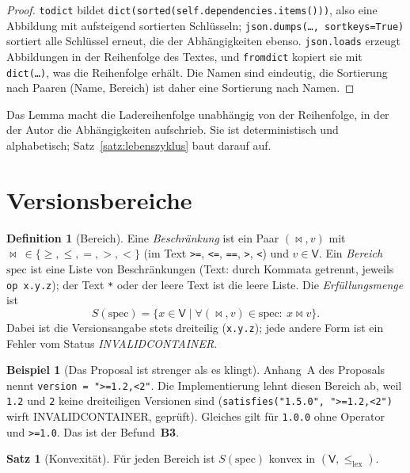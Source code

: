 \documentclass[a4paper,12pt,twoside]{report}
\DeclareRobustCommand{\_}{\ifmmode\mbox{\textunderscore}\else\textunderscore\allowbreak{}\fi}
\theoremstyle{definition}
\newtheorem{definition}{Definition}[chapter]
\newtheorem{beispiel}{Beispiel}[chapter]
\newtheorem{satz}{Satz}[chapter]
\newcommand{\Bf}[1]{\textbf{B#1}}
\begin{document}
\begin{proof}
	\texttt{to\_dict} bildet \texttt{dict(sorted(self.dependencies.items()))}, also eine Abbildung mit aufsteigend sortierten Schlüsseln; \texttt{json.dumps(\ldots, sort\_keys=True)} sortiert alle Schlüssel erneut, die der Abhängigkeiten ebenso. \texttt{json.loads} erzeugt Abbildungen in der Reihenfolge des Textes, und \texttt{from\_dict} kopiert sie mit \texttt{dict(\ldots)}, was die Reihenfolge erhält. Die Namen sind eindeutig, die Sortierung nach Paaren (Name, Bereich) ist daher eine Sortierung nach Namen.
\end{proof}

Das Lemma macht die Ladereihenfolge unabhängig von der Reihenfolge, in der der Autor die Abhängigkeiten aufschrieb. Sie ist deterministisch und alphabetisch; Satz~\ref{satz:lebenszyklus} baut darauf auf.

\section{Versionsbereiche}
\label{sec:versionen}

\begin{definition}[Bereich]
	\label{def:range}
	Eine \emph{Beschränkung} ist ein Paar $(\bowtie,v)$ mit $\bowtie\ \in\{\ge,\le,=,>,<\}$ (im Text \texttt{>=}, \texttt{<=}, \texttt{==}, \texttt{>}, \texttt{<}) und $v\in\mathsf V$. Ein \emph{Bereich} $\mathrm{spec}$ ist eine Liste von Beschränkungen (Text: durch Kommata getrennt, jeweils \texttt{op x.y.z}); der Text \texttt{*} oder der leere Text ist die leere Liste. Die \emph{Erfüllungsmenge} ist
	\[
	S(\mathrm{spec})=\{x\in\mathsf V\mid\forall(\bowtie,v)\in\mathrm{spec}:\ x\bowtie v\}.
	\]
	Dabei ist die Versionsangabe stets dreiteilig (\texttt{x.y.z}); jede andere Form ist ein Fehler vom Status \emph{INVALID\_CONTAINER}.
\end{definition}

\begin{beispiel}[Das Proposal ist strenger als es klingt]
	\label{bsp:range}
	Anhang~A des Proposals nennt \texttt{version = ">=1.2,<2"}. Die Implementierung lehnt diesen Bereich ab, weil \texttt{1.2} und \texttt{2} keine dreiteiligen Versionen sind (\texttt{satisfies("1.5.0", ">=1.2,<2")} wirft INVALID\_CONTAINER, geprüft). Gleiches gilt für \texttt{1.0.0} ohne Operator und \texttt{>=1.0}. Das ist der Befund~\Bf{3}.
\end{beispiel}

\begin{satz}[Konvexität]
	\label{satz:konvex}
	Für jeden Bereich ist $S(\mathrm{spec})$ konvex in $(\mathsf V,\le_{\mathrm{lex}})$.
\end{satz}
\end{document}
